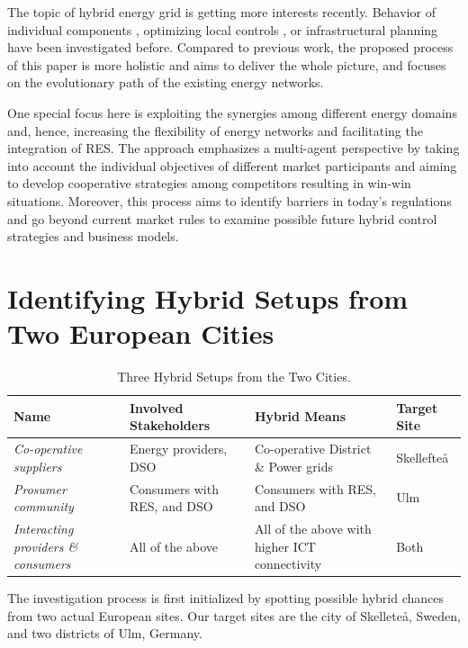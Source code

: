 \documentclass[review]{elsarticle}
\begin{document}
The topic of hybrid energy grid is getting more interests recently. 
Behavior of individual components \cite{keirstead_2012}, optimizing
local controls \cite{etransport}\cite{arnold_2009}, or infrastructural
planning \cite{infraplan} have been investigated before. 
Compared to previous work, the proposed process of this paper is more
holistic and aims to deliver the whole picture, and focuses on the
evolutionary path of the existing energy networks. 

One special focus here is exploiting the synergies among different
energy domains and, hence, increasing the flexibility of energy
networks and facilitating the integration of RES. The approach
emphasizes a multi-agent perspective by taking into account the
individual objectives of different market participants and aiming to
develop cooperative strategies among competitors resulting in win-win 
situations. Moreover, this process aims to identify barriers in
today’s regulations and go beyond current market rules to examine
possible future hybrid control strategies and business models. 

\section{Identifying Hybrid Setups from Two European Cities} 
\label{sec:identifying_hybrid}


\begin{table}[t]
  \small
  \centering
  \caption{Three Hybrid Setups from the Two Cities.}
  \label{tab:1}
  \begin{tabular}{|p{2cm}|p{3cm}|p{3cm}|p{2cm}|}
    \hline
    Name & Involved Stakeholders & Hybrid Means & Target Site \\ \hline
    {\em Co-operative suppliers} & Energy providers, DSO & Co-operative District \& Power grids & Skellefte\aa \\ \hline
    {\em Prosumer community} & Consumers with RES, and DSO & Consumers with RES, and DSO & Ulm \\ \hline
    {\em Interacting providers \& consumers} & All of the above & All of the above with higher ICT connectivity & Both\\ \hline  
  \end{tabular}
\end{table}
The investigation process is first initialized by spotting possible
hybrid chances from two actual European sites. 
Our target sites are the city of Skellete\aa , Sweden, and two
districts of Ulm, Germany.  
\end{document}
